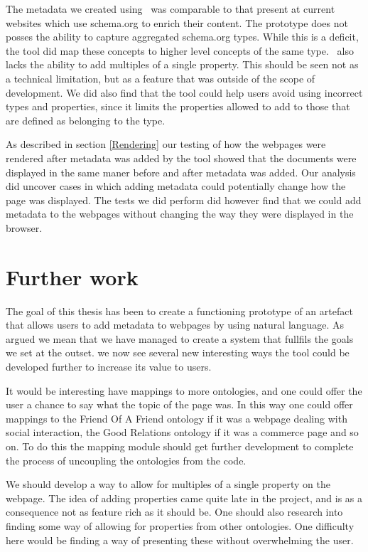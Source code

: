 The metadata we created using \theartefact\ was comparable to that present at current websites which use schema.org to
enrich their content.
The prototype does not posses the ability to capture aggregated schema.org types.
While this is a deficit, the tool did map these concepts to higher level concepts of the same type.
\Theartefact\ also lacks the ability to add multiples of a single property.
This should be seen not as a technical limitation, but as a feature that was outside of the scope of development.
We did also find that the tool could help users avoid using incorrect types and properties,
since it limits the properties allowed to add to those that are defined as belonging to the type.

As described in section \ref{Rendering} our testing of how the webpages were rendered after metadata was added by the tool
showed that the documents were displayed in the same maner before and after metadata was added.
Our analysis did uncover cases in which adding metadata could potentially change how the page was displayed.
The tests we did perform did however find that we could add metadata to the webpages without changing the way they were displayed in the browser.


\section{Further work}
The goal of this thesis has been to create a functioning prototype of an artefact that allows users to add metadata
to webpages by using natural language.
As argued we mean that we have managed to create a system that fullfils the goals we set at the outset.
we now see several new interesting ways the tool could be developed further to increase its value to users.

It would be interesting have mappings to more ontologies,
and one could offer the user a chance to say what the topic of the page was.
In this way one could offer mappings to the Friend Of A Friend ontology if it was a webpage dealing with
social interaction, the Good Relations ontology if it was a commerce page and so on.
To do this the mapping module should get further development to complete the process of uncoupling the ontologies
from the code.

We should develop a way to allow for multiples of a single property on the webpage.
The idea of adding properties came quite late in the project,
and is as a consequence not as feature rich as it should be.
One should also research into finding some way of allowing for properties from other ontologies.
One difficulty here would be finding a way of presenting these without overwhelming the user.


